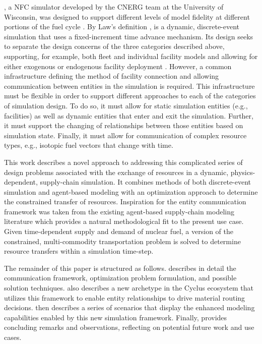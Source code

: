 \Cyclus, a NFC simulator developed by the CNERG team at the University of
Wisconsin, was designed to support different levels of model fidelity at
different portions of the fuel cycle \cite{huff_cyclus_2015}. By Law's
definition \cite{Law:1999:SMA:554952}, \Cyclus is a dynamic, discrete-event
simulation that uses a fixed-increment time advance mechanism. Its design seeks
to separate the design concerns of the three categories described above,
supporting, for example, both fleet and individual facility models and allowing
for either exogenous or endogenous facility deployment
\cite{carlsen_fleet_2016}. However, a common infrastructure defining the method
of facility connection and allowing communication between entities in the
simulation is required. This infrastructure must be flexible in order to support
different approaches to each of the categories of simulation design. To do so,
it must allow for static simulation entities (e.g., facilities) as well as
dynamic entities that enter and exit the simulation. Further, it must support
the changing of relationships between those entities based on simulation
state. Finally, it must allow for communication of complex resource types, e.g.,
isotopic fuel vectors that change with time.

This work describes a novel approach to addressing this complicated series of
design problems associated with the exchange of resources in a dynamic,
physics-dependent, supply-chain simulation. It combines methods of both
discrete-event simulation and agent-based modeling with an optimization approach
to determine the constrained transfer of resources. Inspiration for the entity
communication framework was taken from the existing agent-based supply-chain
modeling literature
\cite{swaminathan_modeling_1998,julka_agent-based_2002,van_der_zee_modeling_2005,chatfield_multi-formalism_2007,holmgren_agent_2007}
which provides a natural methodological fit to the present use case. Given
time-dependent supply and demand of nuclear fuel, a version of the constrained,
multi-commodity transportation problem is solved to determine resource transfers
within a simulation time-step.


The remainder of this paper is structured as follows. 
describes in detail the communication framework, optimization problem
formulation, and possible solution techniques.  also
describes a new archetype in the Cyclus ecosystem that utilizes this framework
to enable entity relationships to drive material routing
decisions.  then describes a series of scenarios that
display the enhanced modeling capabilities enabled by this new simulation
framework. Finally,  provides concluding remarks and
observations, reflecting on potential future work and use cases.
